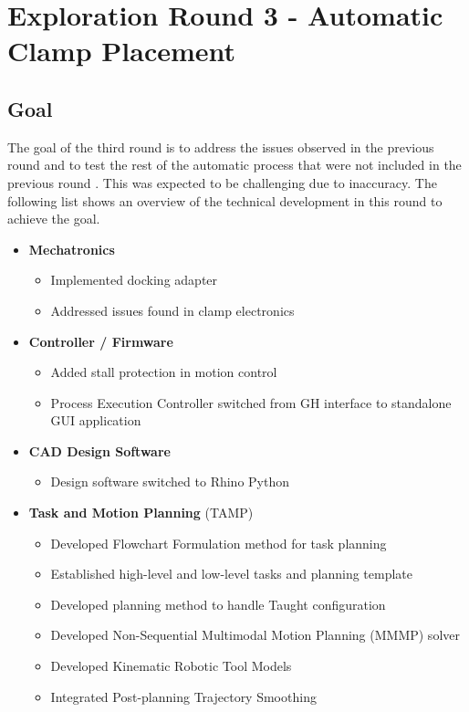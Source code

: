\chapter{Exploration Round 3 - Automatic Clamp Placement}
\label{chapter:exploration-round-3}

\section{Goal}
\label{section:exploration-3-goal}

The goal of the third round is to address the issues observed in the previous round and to test the rest of the automatic process that were not included in the previous round . This was expected to be challenging due to inaccuracy. The following list shows an overview of the technical development in this round to achieve the goal. 

\begin{itemize}
	\item \textbf{Mechatronics}
    \begin{itemize}
	   \item Implemented docking adapter
	   \item Addressed issues found in clamp electronics
    \end{itemize}
    
	\item \textbf{Controller / Firmware}
    \begin{itemize}
    	\item Added stall protection in motion control
    	\item Process Execution Controller switched from GH interface to standalone GUI application
    \end{itemize}
    
	\item \textbf{CAD Design Software}
    \begin{itemize}
    	\item Design software switched to Rhino Python
    \end{itemize}
    
    \item \textbf{Task and Motion Planning }(TAMP)
    \begin{itemize}
    	\item Developed Flowchart Formulation method for task planning
    	\item Established high-level and low-level tasks and planning template
    	\item Developed planning method to handle Taught configuration
    	\item Developed Non-Sequential Multimodal Motion Planning (MMMP) solver
    	\item Developed Kinematic Robotic Tool Models
    	\item Integrated Post-planning Trajectory Smoothing
    \end{itemize}
    
\end{itemize}

